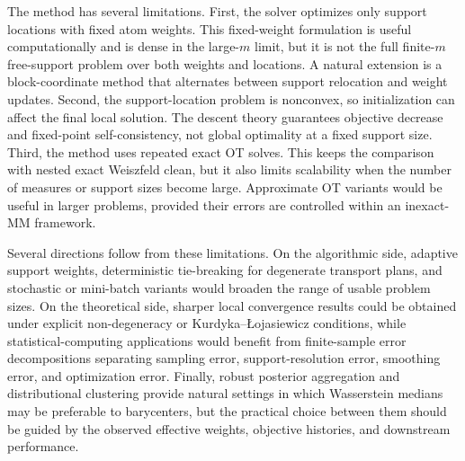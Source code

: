 \documentclass[pdflatex,sn-mathphys-ay]{sn-jnl}%
\theoremstyle{thmstyleone}%
\theoremstyle{thmstyletwo}%
\theoremstyle{thmstylethree}%
\newcommand{\KLoja}{Kurdyka--\L{}ojasiewicz\xspace}
\begin{document}
The method has several limitations. First, the solver optimizes only support locations with fixed atom weights. This fixed-weight formulation is useful computationally and is dense in the large-\(m\) limit, but it is not the full finite-\(m\) free-support problem over both weights and locations. A natural extension is a block-coordinate method that alternates between support relocation and weight updates. Second, the support-location problem is nonconvex, so initialization can affect the final local solution. The descent theory guarantees objective decrease and fixed-point self-consistency, not global optimality at a fixed support size. Third, the method uses repeated exact OT solves. This keeps the comparison with nested exact Weiszfeld clean, but it also limits scalability when the number of measures or support sizes become large. Approximate OT variants would be useful in larger problems, provided their errors are controlled within an inexact-MM framework.

Several directions follow from these limitations. On the algorithmic side, adaptive support weights, deterministic tie-breaking for degenerate transport plans, and stochastic or mini-batch variants would broaden the range of usable problem sizes. On the theoretical side, sharper local convergence results could be obtained under explicit non-degeneracy or \KLoja conditions, while statistical-computing applications would benefit from finite-sample error decompositions separating sampling error, support-resolution error, smoothing error, and optimization error. Finally, robust posterior aggregation and distributional clustering provide natural settings in which Wasserstein medians may be preferable to barycenters, but the practical choice between them should be guided by the observed effective weights, objective histories, and downstream performance.









\end{document}
